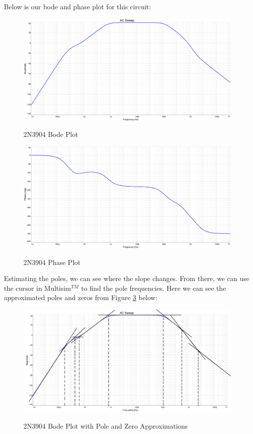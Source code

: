 \documentclass[12pt]{article}
\begin{document}
Below is our bode and phase plot for this circuit:

\begin{figure}[H]
\centering
\includegraphics[height=0.45\textwidth]{Images/part2a.png}\\
\caption{2N3904 Bode Plot}
\label{fig:part2a_bodeplot}
\end{figure}

\begin{figure}[H]
\centering
\includegraphics[height=0.45\textwidth]{Images/2a_2N3904_phase.png}\\
\caption{2N3904 Phase Plot}
\label{fig:part2a_phaseplot}
\end{figure}

Estimating the poles, we can see where the slope changes. From there, we can use the cursor in Multisim$^{TM}$ to find the pole frequencies. Here we can see the approximated poles and zeros from Figure \ref{fig:part2a_bodeplot_approximations} below:
\begin{figure}[H]
\centering
\includegraphics[height=0.45\textwidth]{Images/2abode_approximations.png}\\
\caption{2N3904 Bode Plot with Pole and Zero Approximations}
\label{fig:part2a_bodeplot_approximations}
\end{figure}
\end{document}

